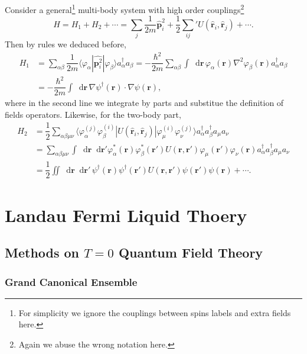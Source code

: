 \documentclass[b5paper,10pt,UTF8]{book}
\newcommand*\dd{\mathop{}\!\mathrm{d}}
\numberwithin{equation}{section}
\begin{document}
		\begin{Example}
			Consider a general\footnote{For simplicity we ignore the couplings between spins labels and extra fields here.} multi-body system with high order couplings\footnote{Again we abuse the wrong notation here.}
			$$H=H_1+H_2+\cdots=\sum_j\dfrac{1}{2m}\hat{\bm p}_i^2+\dfrac{1}{2}{\sum_{ij}}'U(\hat{\bm{r}}_i,\hat{\bm{r}}_j)+\cdots.$$
			Then by rules we deduced before,
			\begin{align*}
				H_1&=\sum_{\alpha\beta}\dfrac{1}{2m}\langle\varphi_\alpha|\hat{\bm{p}^2_i}|\varphi_\beta\rangle a_\alpha^\dagger a_\beta=-\dfrac{\hbar^2}{2m}\sum_{\alpha\beta}\int\dd\bm{r}\,\varphi_\alpha(\bm{r})\nabla^2\varphi_\beta(\bm{r})a_\alpha^\dagger a_\beta\\
				&=-\dfrac{\hbar^2}{2m}\int\dd\bm{r}\,\nabla\psi^\dagger(\bm{r})\cdot\nabla\psi(\bm{r}),
			\end{align*}
			where in the second line we integrate by parts and substitue the definition of fields operators. Likewise, for the two-body part,
			\begin{align*}
				H_2&=\dfrac{1}{2}\sum_{\alpha\beta\mu\nu}\langle\varphi_\alpha^{(j)}\varphi_\beta^{(i)}|U(\hat{\bm r}_i,\hat{\bm r}_j)|\varphi_\mu^{(i)}\varphi^{(j)}_\nu\rangle a_\alpha^\dagger a_\beta^\dagger a_\mu a_\nu\\
				&=\sum_{\alpha\beta\mu\nu}\int\dd\bm{r}\dd\bm{r'}\varphi_\alpha^*(\bm{r})\varphi_\beta^*(\bm{r'})U(\bm{r},\bm{r'})\varphi_\mu(\bm{r'})\varphi_\nu(\bm{r})a_\alpha^\dagger a_\beta^\dagger a_\mu a_\nu\\
				&=\dfrac{1}{2}\iint\dd\bm{r}\dd\bm{r'}\,\psi^\dagger(\bm{r})\psi^\dagger(\bm{r'})U(\bm{r},\bm{r'})\psi(\bm{r'})\psi(\bm{r})+\cdots.
			\end{align*}
		\end{Example}

\part{Landau Fermi Liquid Thoery}
\chapter{Methods on $T=0$ Quantum Field Theory}
	\section{Grand Canonical Ensemble}
\end{document}
